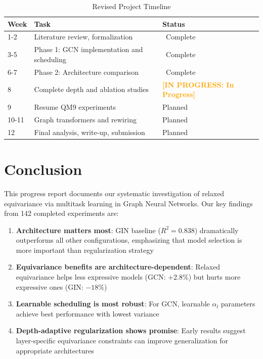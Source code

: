 \documentclass[11pt,a4paper]{article}
\newcommand{\inprogress}[1]{\textcolor{orange}{\textbf{[IN PROGRESS: #1]}}}
\newcommand{\completed}[1]{\textcolor{green!60!black}{\checkmark\ #1}}
\begin{document}
\begin{table}[H]
\centering
\caption{Revised Project Timeline}
\label{tab:timeline}
\begin{tabular}{lll}
\toprule
\textbf{Week} & \textbf{Task} & \textbf{Status} \\
\midrule
1-2 & Literature review, formalization & \completed{Complete} \\
3-5 & Phase 1: GCN implementation and scheduling & \completed{Complete} \\
6-7 & Phase 2: Architecture comparison & \completed{Complete} \\
8 & Complete depth and ablation studies & \inprogress{In Progress} \\
9 & Resume QM9 experiments & Planned \\
10-11 & Graph transformers and rewiring & Planned \\
12 & Final analysis, write-up, submission & Planned \\
\bottomrule
\end{tabular}
\end{table}

\section{Conclusion}

This progress report documents our systematic investigation of relaxed equivariance via multitask learning in Graph Neural Networks. Our key findings from 142 completed experiments are:

\begin{enumerate}
    \item \textbf{Architecture matters most}: GIN baseline ($R^2 = 0.838$) dramatically outperforms all other configurations, emphasizing that model selection is more important than regularization strategy
    
    \item \textbf{Equivariance benefits are architecture-dependent}: Relaxed equivariance helps less expressive models (GCN: +2.8\%) but hurts more expressive ones (GIN: $-18\%$)
    
    \item \textbf{Learnable scheduling is most robust}: For GCN, learnable $\alpha_l$ parameters achieve best performance with lowest variance
    
    \item \textbf{Depth-adaptive regularization shows promise}: Early results suggest layer-specific equivariance constraints can improve generalization for appropriate architectures
\end{enumerate}
\end{document}
